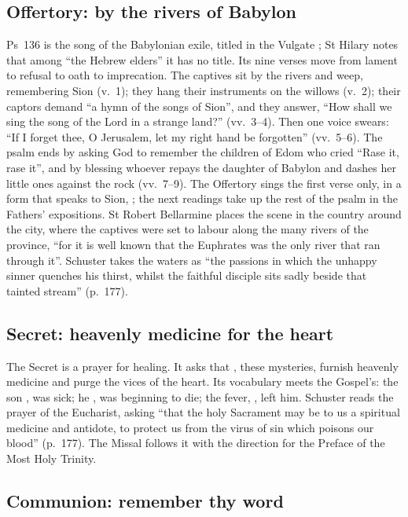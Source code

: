 \subsection{Offertory: by the rivers of Babylon}

Ps~136 is the song of the Babylonian exile, titled in the Vulgate
; St Hilary notes that among ``the Hebrew
elders'' it has no title. Its nine verses move from lament to refusal to oath
to imprecation. The captives sit by the rivers and weep, remembering Sion
(v.~1); they hang their instruments on the willows (v.~2); their captors demand
``a hymn of the songs of Sion'', and they answer, ``How shall we sing the song
of the Lord in a strange land?'' (vv.~3--4). Then one voice swears: ``If I
forget thee, O Jerusalem, let my right hand be forgotten'' (vv.~5--6). The psalm
ends by asking God to remember the children of Edom who cried ``Rase it, rase
it'', and by blessing whoever repays the daughter of Babylon and dashes her
little ones against the rock (vv.~7--9). The Offertory sings the first verse
only, in a form that speaks to Sion, ; the next readings take
up the rest of the psalm in the Fathers' expositions. St Robert Bellarmine
places the scene in the country around the city, where the captives were set
to labour along the many rivers of the province, ``for it is well known that
the Euphrates was the only river that ran through it''. Schuster takes the
waters as ``the passions in which the unhappy sinner quenches his thirst,
whilst the faithful disciple sits sadly beside that tainted stream'' (p.~177).

\subsection{Secret: heavenly medicine for the heart}

The Secret is a prayer for healing. It asks that , these
mysteries, furnish heavenly medicine and purge the vices of the heart. Its
vocabulary meets the Gospel's: the son , was sick; he
, was beginning to die; the fever, , left
him. Schuster reads the prayer of the Eucharist, asking ``that the holy
Sacrament may be to us a spiritual medicine and antidote, to protect us from
the virus of sin which poisons our blood'' (p.~177). The Missal follows it with
the direction for the Preface of the Most Holy Trinity.

\subsection{Communion: remember thy word}

